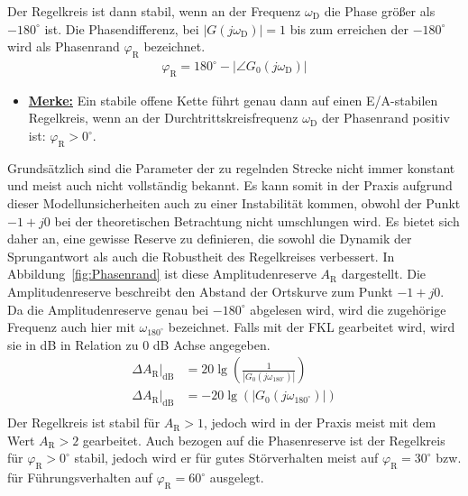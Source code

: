 %
Der Regelkreis ist dann stabil, wenn an der Frequenz $\omega_{\text{D}}$ die Phase größer als $-180^{\circ}$ ist. Die Phasendifferenz, bei $|G(j\omega_{\text{D}})|=1$  bis zum erreichen der $-180^{\circ}$ wird als Phasenrand $\varphi_{\text{R}}$ bezeichnet.
%
\begin{equation*}
\begin{aligned}
%
\varphi_{\text{R}} = 180^{\circ} - \left|\angle G_{0}(j \omega_{\text{D}})\right|
%
\end{aligned}
\end{equation*}
%
\begin{itemize}
%
\item \underline{\textbf{Merke:}} Ein stabile offene Kette führt genau dann auf einen E/A-stabilen Regelkreis, wenn an der Durchtrittskreisfrequenz $\omega_{\text{D}}$ der Phasenrand positiv ist: $\varphi_{\text{R}}>0^{\circ}$.
%
\end{itemize}
%
Grundsätzlich sind die Parameter der zu regelnden Strecke nicht immer konstant und meist auch nicht vollständig bekannt. Es kann somit in der Praxis aufgrund dieser Modellunsicherheiten auch zu einer Instabilität kommen, obwohl der Punkt $-1+j0$ bei der theoretischen Betrachtung nicht umschlungen wird. Es bietet sich daher an, eine gewisse Reserve zu definieren, die sowohl die Dynamik der Sprungantwort als auch die Robustheit des Regelkreises verbessert. In Abbildung~\ref{fig:Phasenrand} ist diese Amplitudenreserve $A_{\text{R}}$ dargestellt.
%
Die Amplitudenreserve beschreibt den Abstand der Ortskurve zum Punkt $-1+j0$. Da die Amplitudenreserve genau bei $-180^{\circ}$ abgelesen wird, wird die zugehörige Frequenz auch hier mit $\omega_{180^{\circ}}$ bezeichnet. Falls mit der FKL gearbeitet wird, wird sie in dB in Relation zu 0 dB Achse angegeben.
\begin{equation*}
\begin{aligned}
%
\Delta A_{\text{R}}|_{\text{dB}} &= 20\lg\left(\frac{1}{|G_{0}(j \omega_{180^{\circ}})|}\right)\\
%
\Delta A_{\text{R}}|_{\text{dB}} &= -20\lg\left(|G_{0}(j \omega_{180^{\circ}})|\right)\\
%
\end{aligned}
\end{equation*}
%
Der Regelkreis ist stabil für $A_{\text{R}}>1$, jedoch wird in der Praxis meist mit dem Wert $A_{\text{R}}>2$ gearbeitet. Auch bezogen auf die Phasenreserve ist der Regelkreis für $\varphi_{\text{R}}>0^{\circ}$ stabil, jedoch wird er für gutes Störverhalten meist auf $\varphi_{\text{R}}=30^{\circ}$ bzw. für Führungsverhalten auf $\varphi_{\text{R}}=60^{\circ}$ ausgelegt.\\
%

